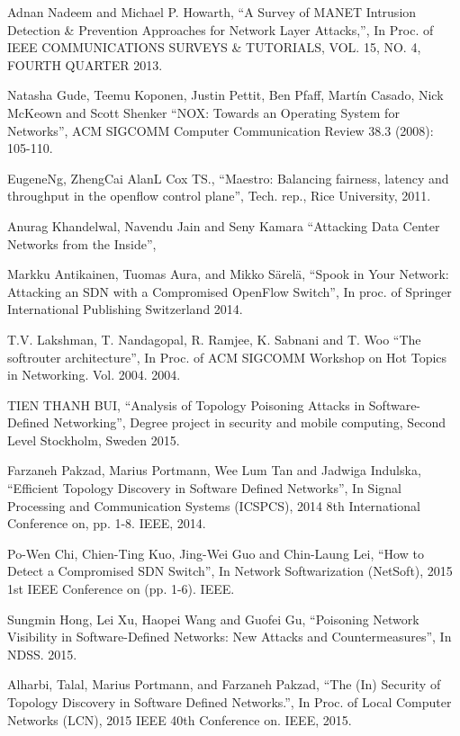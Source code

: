 \begin{thebibliography}{1}

Adnan Nadeem and Michael P. Howarth,
``A Survey of MANET Intrusion Detection \& Prevention Approaches for Network Layer Attacks,'', In Proc. of IEEE COMMUNICATIONS SURVEYS \& TUTORIALS, VOL. 15, NO. 4, FOURTH QUARTER 2013.

Natasha Gude, Teemu Koponen, Justin Pettit, Ben Pfaff, Martín Casado, Nick McKeown and Scott Shenker
``NOX: Towards an Operating System for Networks'', ACM SIGCOMM Computer Communication Review 38.3 (2008): 105-110.

\bibitem{}
EugeneNg, ZhengCai AlanL Cox TS.,
``Maestro: Balancing fairness, latency and throughput in the openflow control plane'', Tech. rep., Rice University, 2011.

Anurag Khandelwal, Navendu Jain and Seny Kamara
``Attacking Data Center Networks from the Inside'', 

Markku Antikainen, Tuomas Aura, and Mikko Särelä,
``Spook in Your Network: Attacking an SDN with a Compromised OpenFlow Switch'', In proc. of Springer International Publishing Switzerland 2014.

T.V. Lakshman, T. Nandagopal, R. Ramjee, K. Sabnani and T. Woo
``The softrouter architecture'', In Proc. of ACM SIGCOMM Workshop on Hot Topics in Networking. Vol. 2004. 2004.

TIEN THANH BUI,
``Analysis of Topology Poisoning Attacks in Software-Defined Networking'', Degree project in security and mobile computing, Second Level Stockholm, Sweden 2015.

Farzaneh Pakzad, Marius Portmann, Wee Lum Tan and Jadwiga Indulska,
``Efficient Topology Discovery in Software Defined Networks'', In Signal Processing and Communication Systems (ICSPCS), 2014 8th International Conference on, pp. 1-8. IEEE, 2014. 

Po-Wen Chi, Chien-Ting Kuo, Jing-Wei Guo and Chin-Laung Lei,
``How to Detect a Compromised SDN Switch'', In Network Softwarization (NetSoft), 2015 1st IEEE Conference on (pp. 1-6). IEEE.

Sungmin Hong, Lei Xu, Haopei Wang and Guofei Gu,
``Poisoning Network Visibility in Software-Defined Networks: New Attacks and Countermeasures'', In NDSS. 2015. 

Alharbi, Talal, Marius Portmann, and Farzaneh Pakzad,
``The (In) Security of Topology Discovery in Software Defined Networks.'', In Proc. of Local Computer Networks (LCN), 2015 IEEE 40th Conference on. IEEE, 2015.


\end{thebibliography}
